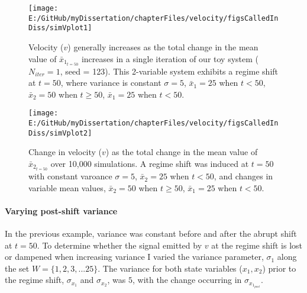 \documentclass[]{article}
\let\oldparagraph\paragraph
\renewcommand{\paragraph}[1]{\oldparagraph{#1}\mbox{}}
\begin{document}
\begin{figure}

{\centering \texttt{[image: E:/GitHub/myDissertation/chapterFiles/velocity/figsCalledInDiss/simVplot1]} 

}

\caption{Velocity ($v$) generally increases as the total change in the mean value of $\bar{x}_{1_{t=50}}$ increases in a single iteration of our toy system ($N_{iter}=1$, seed = 123). This 2-variable system exhibits a regime shift at $t=50$, where variance is constant $\sigma = 5$, $\bar{x}_1 = 25$ when $t<50$,  $\bar{x}_2=50$ when $t\geq50$, $\bar{x}_1 = 25$ when $t <50$.}\label{fig:simVplot1}
\end{figure}
\begin{figure}

{\centering \texttt{[image: E:/GitHub/myDissertation/chapterFiles/velocity/figsCalledInDiss/simVplot2]} 

}

\caption{Change in velocity ($v$) as the total change in the mean value of $\bar{x}_{2_{t=50}}$ over 10,000 simulations. A regime shift was induced at $t=50$ with constant varoance $\sigma = 5$, $\bar{x}_2 = 25$ when $t<50$,  and changes in variable mean values, $\bar{x}_2 = 50$ when $t \geq 50$, $\bar{x}_1 = 25$ when $t<50$.}\label{fig:simVplot2}
\end{figure}

\hypertarget{varying-post-shift-variance}{%
\paragraph{Varying post-shift
variance}\label{varying-post-shift-variance}}

In the previous example, variance was constant before and after the
abrupt shift at \(t=50\). To determine whether the signal emitted by
\(v\) at the regime shift is lost or dampened when increasing variance I
varied the variance parameter, \(\sigma_1\) along the set
\(W = \{1,2,3,...25 \}\). The variance for both state variables
(\(x_1, x_2\)) prior to the regime shift, \(\sigma_{x_1}\) and
\(\sigma_{x_2}\), was \(5\), with the change occurring in
\(\sigma_{x{_1_{post}}}\).
\end{document}
